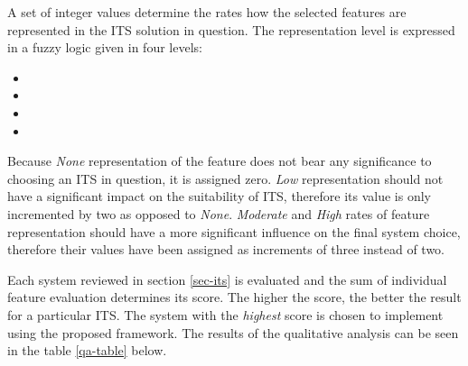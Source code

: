 \documentclass[0main.tex]{subfiles}
\begin{document}
A set of integer values determine the rates how the selected features are represented in the 
ITS solution in question. The representation level is expressed in a fuzzy logic given in four levels:

\begin{itemize}
    \item {}
    \item {}
    \item {}
    \item {}
\end{itemize}

Because \emph{None} representation of the feature does not bear any significance to choosing an ITS 
in question, it is assigned zero. \emph{Low} representation should not have a significant impact on 
the suitability of ITS, therefore its value is only incremented by two as opposed to \emph{None}. \emph{Moderate}
and \emph{High} rates of feature representation should have a more significant influence on the final system 
choice, therefore their values have been assigned as increments of three instead of two. 

Each system reviewed in section \ref{sec-its} is evaluated and the sum of individual feature evaluation 
determines its score. The higher the score, the better the result for a particular ITS. The system 
with the \emph{highest} score is chosen to implement using the proposed framework. The results of the 
qualitative analysis can be seen in the table \ref{qa-table} below.
\end{document}
